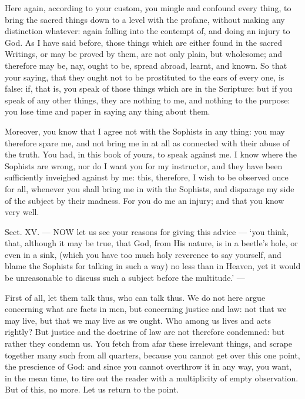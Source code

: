 Here again, according to your custom, you mingle and confound every thing, to bring the sacred things down to a level with the profane, without making any distinction whatever: again falling into the contempt of, and doing an injury to God. As I have said before, those things which are either found in the sacred Writings, or may be proved by them, are not only plain, but wholesome; and therefore may be, nay, ought to be, spread abroad, learnt, and known. So that your saying, that they ought not to be prostituted to the ears of every one, is false: if, that is, you speak of those things which are in the Scripture: but if you speak of any other things, they are nothing to me, and nothing to the purpose: you lose time and paper in saying any thing about them.

Moreover, you know that I agree not with the Sophists in any thing: you may therefore spare me, and not bring me in at all as connected with their abuse of the truth. You had, in this book of yours, to speak against me. I know where the Sophists are wrong, nor do I want you for my instructor, and they have been sufficiently inveighed against by me: this, therefore, I wish to be observed once for all, whenever you shall bring me in with the Sophists, and disparage my side of the subject by their madness. For you do me an injury; and that you know very well.


Sect. XV. — NOW let us see your reasons for giving this advice — ‘you think, that, although it may be true, that God, from His nature, is in a beetle’s hole, or even in a sink, (which you have too much holy reverence to say yourself, and blame the Sophists for talking in such a way) no less than in Heaven, yet it would be unreasonable to discuss such a subject before the multitude.’ —

First of all, let them talk thus, who can talk thus. We do not here argue concerning what are facts in men, but concerning justice and law: not that we may live, but that we may live as we ought. Who among us lives and acts rightly? But justice and the doctrine of law are not therefore condemned: but rather they condemn us. You fetch from afar these irrelevant things, and scrape together many such from all quarters, because you cannot get over this one point, the prescience of God: and since you cannot overthrow it in any way, you want, in the mean time, to tire out the reader with a multiplicity of empty observation. But of this, no more. Let us return to the point.

